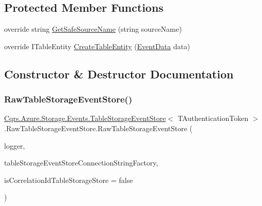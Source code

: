 \subsection*{Protected Member Functions}
\begin{DoxyCompactItemize}
\item 
override string \hyperlink{classCqrs_1_1Azure_1_1Storage_1_1Events_1_1TableStorageEventStore_1_1RawTableStorageEventStore_ad7534d979a3f13221c237f3da3cafafb_ad7534d979a3f13221c237f3da3cafafb}{Get\+Safe\+Source\+Name} (string source\+Name)
\item 
override I\+Table\+Entity \hyperlink{classCqrs_1_1Azure_1_1Storage_1_1Events_1_1TableStorageEventStore_1_1RawTableStorageEventStore_ae285669c3a810c79b4f50382209e6843_ae285669c3a810c79b4f50382209e6843}{Create\+Table\+Entity} (\hyperlink{classCqrs_1_1Events_1_1EventData}{Event\+Data} data)
\end{DoxyCompactItemize}


\subsection{Constructor \& Destructor Documentation}
\mbox{\label{classCqrs_1_1Azure_1_1Storage_1_1Events_1_1TableStorageEventStore_1_1RawTableStorageEventStore_ad82ce92dd98e683b11b2bdc0b8d5bebc_ad82ce92dd98e683b11b2bdc0b8d5bebc}} 
\subsubsection{\texorpdfstring{Raw\+Table\+Storage\+Event\+Store()}{RawTableStorageEventStore()}}
{\footnotesize\ttfamily \hyperlink{classCqrs_1_1Azure_1_1Storage_1_1Events_1_1TableStorageEventStore}{Cqrs.\+Azure.\+Storage.\+Events.\+Table\+Storage\+Event\+Store}$<$ T\+Authentication\+Token $>$.Raw\+Table\+Storage\+Event\+Store.\+Raw\+Table\+Storage\+Event\+Store (\begin{DoxyParamCaption}\item[{I\+Logger}]{logger,  }\item[{\hyperlink{interfaceCqrs_1_1Azure_1_1BlobStorage_1_1ITableStorageStoreConnectionStringFactory}{I\+Table\+Storage\+Store\+Connection\+String\+Factory}}]{table\+Storage\+Event\+Store\+Connection\+String\+Factory,  }\item[{bool}]{is\+Correlation\+Id\+Table\+Storage\+Store = {\ttfamily false} }\end{DoxyParamCaption})}



